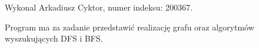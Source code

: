 \-Wykonal \-Arkadiusz \-Cyktor, numer indeksu\-: 200367.

\-Program ma za zadanie przedstawić realizację grafu oraz algorytmów wyszukujących \-D\-F\-S i \-B\-F\-S. 